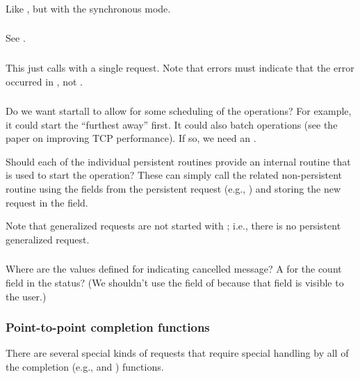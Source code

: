 \documentclass{article}
\begin{document}
\subsubsection{}
Like , but with the synchronous mode.

\subsubsection{}
See .

\subsubsection{}
This just calls  with a single request.  Note that
errors must indicate that the error occurred in , not
.  

\subsubsection{}
Do we want startall to allow for some scheduling of the operations?  For
example, it could start the ``furthest away'' first.  It could also batch
operations (see the paper on improving TCP performance).  If so, we
need an .

Should each of the individual persistent routines provide an internal
routine that is used to start the operation?
These can simply call the related non-persistent routine using the fields from
the persistent request (e.g., )
and storing the new request in the 
field. 

Note that generalized requests are not started with ; i.e.,
there is no persistent generalized request.

\subsubsection{}
Where are the values defined for indicating cancelled message?
A  for the count field in the
status?
(We shouldn't use the  field of
 because that field is visible to the user.)

\subsubsection{Point-to-point completion functions}
There are several special kinds of requests that require special handling by
all of the completion (e.g.,  and )
functions. 
\end{document}
